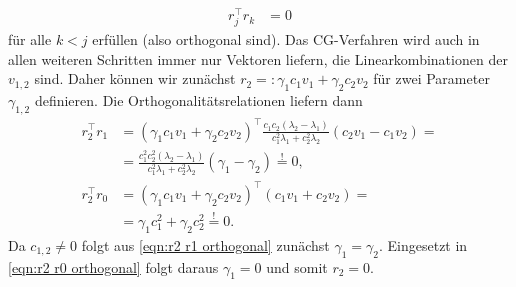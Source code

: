 \documentclass[english, parskip=full]{scrartcl}
\newcommand{\kla}{}
\begin{document}
\begin{align}
r_j^\top r_k &= 0
\end{align}
für alle $k<j$ erfüllen (also orthogonal sind).
Das CG-Verfahren wird auch in allen weiteren Schritten immer nur Vektoren liefern, die Linearkombinationen der $v_{1,2}$ sind.
Daher können wir zunächst $r_2 =: \gamma_1c_1v_1 + \gamma_2c_2v_2$ für zwei Parameter $\gamma_{1,2}$ definieren.
Die Orthogonalitätsrelationen liefern dann
\begin{align}
r_2^\top r_1 &= \kla\left( \gamma_1c_1v_1 + \gamma_2c_2v_2 \right)^\top  \frac{c_1c_2 (\lambda_2 - \lambda_1)}{c_1^2\lambda_1 + c_2^2\lambda_2} \kla\left( c_2v_1 - c_1v_2 \right) = \\
&= \frac{c_1^2c_2^2 (\lambda_2 - \lambda_1)}{c_1^2\lambda_1 + c_2^2\lambda_2}\kla\left( \gamma_1 - \gamma_2 \right) \overset{!}{=} 0, \label{eqn:r2 r1 orthogonal}\\
r_2^\top r_0 &= \kla\left( \gamma_1c_1v_1 + \gamma_2c_2v_2 \right)^\top  \kla\left( c_1v_1+c_2v_2 \right) = \\
&= \gamma_1c_1^2 + \gamma_2c_2^2 \overset{!}{=} 0. \label{eqn:r2 r0 orthogonal}
\end{align}
Da $c_{1,2}\neq 0 $ folgt aus \autoref{eqn:r2 r1 orthogonal} zunächst $\gamma_1=\gamma_2$.
Eingesetzt in \autoref{eqn:r2 r0 orthogonal} folgt daraus $\gamma_1=0$ und somit $r_2 = 0$.

\newpage
\end{document}
